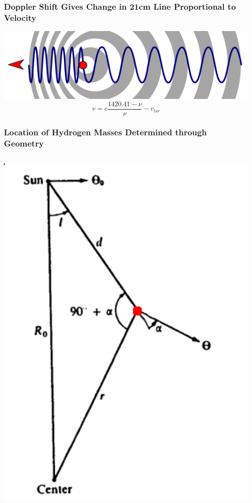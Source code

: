 \documentclass{beamer}
\begin{document}
\begin{frame}
  \frametitle{Doppler Shift Gives Change in 21cm Line Proportional to Velocity}
  \includegraphics[width=1\textwidth]{diagrammatic}
  \begin{equation*}
    v = c \frac{1420.41 - \nu}{\nu} - v_{lsr}
\end{equation*}
\end{frame}

\begin{frame}
  \frametitle{Location of Hydrogen Masses Determined through Geometry}
  \begin{columns}
    \begin{column}{0.4\textwidth}
  \includegraphics[width=1\textwidth]{geom}

\end{column}
\end{columns}
\end{frame}
\end{document}
